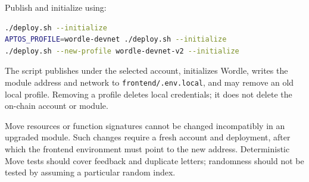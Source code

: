 \documentclass[10pt]{article}
\begin{document}
Publish and initialize using:
\begin{lstlisting}[language=bash]
./deploy.sh --initialize
APTOS_PROFILE=wordle-devnet ./deploy.sh --initialize
./deploy.sh --new-profile wordle-devnet-v2 --initialize
\end{lstlisting}

The script publishes under the selected account, initializes Wordle, writes the module address and network to \texttt{frontend/.env.local}, and may remove an old local profile. Removing a profile deletes local credentials; it does not delete the on-chain account or module.

Move resources or function signatures cannot be changed incompatibly in an upgraded module. Such changes require a fresh account and deployment, after which the frontend environment must point to the new address. Deterministic Move tests should cover feedback and duplicate letters; randomness should not be tested by assuming a particular random index.
\end{document}

